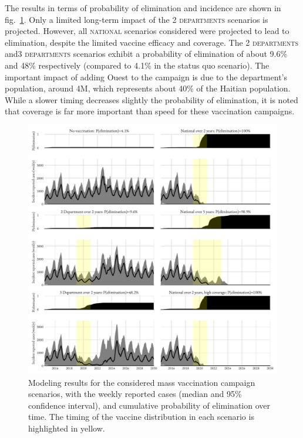 The results in terms of probability of elimination and incidence are shown in fig.~\ref{fig:OCVresults}. Only a limited long-term impact of the \textsc{2 departments} scenarios is projected. However, all \textsc{national} scenarios considered were projected to lead to elimination, despite the limited vaccine efficacy and coverage. The \textsc{2 departments} and\textsc{3 departments} scenarios exhibit a probability of elimination of about 9.6\% and 48\% respectively (compared to 4.1\% in the status quo scenario). The important impact of adding Ouest to the campaign is due to the department's population, around 4M, which represents about 40\% of the Haitian population. While a slower timing decreases slightly the probability of elimination, it is noted that coverage is far more important than speed for these vaccination campaigns.

\begin{figure}[h!]%
\begin{center}
\includegraphics{fig_cholera-haiti-ocv/haiti-scn.pdf}
\caption[Cholera in Haiti after mass vaccination campaigns]{Modeling results for the considered mass vaccination campaign scenarios, with the weekly reported cases (median and 95\% confidence interval), and cumulative probability of elimination over time. The timing of the vaccine distribution in each scenario is highlighted in yellow.}
\label{fig:OCVresults}
\end{center}
\end{figure}
 
